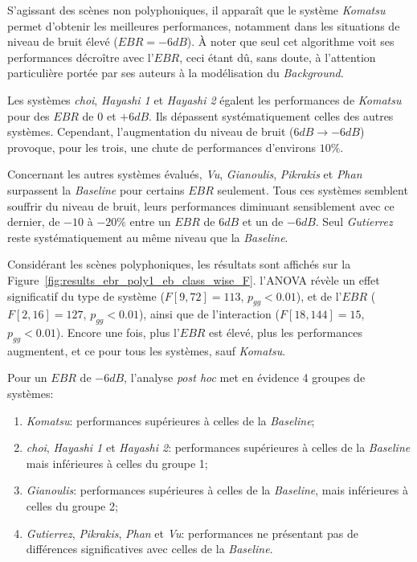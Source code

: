 S'agissant des scènes non polyphoniques, il apparaît que le système \emph{Komatsu} permet d'obtenir les meilleures performances, notamment dans les situations de niveau de bruit élevé ($EBR=-6dB$). À noter que seul cet algorithme voit ses performances décroître avec l'$EBR$, ceci étant dû, sans doute, à l'attention particulière portée par ses auteurs à la modélisation du \emph{Background}.


Les systèmes \emph{choi}, \emph{Hayashi 1} et \emph{Hayashi 2} égalent les performances de \emph{Komatsu} pour des $EBR$ de $0$ et $+6dB$. Ils dépassent systématiquement celles des autres systèmes. Cependant, l'augmentation du niveau de bruit ($6dB\rightarrow -6dB$) provoque, pour les trois, une chute de performances d'environs $10\%$.

Concernant les autres systèmes évalués, \emph{Vu}, \emph{Gianoulis}, \emph{Pikrakis} et \emph{Phan} surpassent la \emph{Baseline} pour certains $EBR$ seulement. Tous ces systèmes semblent souffrir du niveau de bruit, leurs performances diminuant sensiblement avec ce dernier, de $-10$ à $-20\%$ entre un $EBR$ de $6dB$ et un de $-6dB$. Seul \emph{Gutierrez} reste systématiquement au même niveau que la \emph{Baseline}.

Considérant les scènes polyphoniques, les résultats sont affichés sur la Figure~\ref{fig:results_ebr_poly1_eb_class_wise_F}. l'ANOVA révèle un effet significatif du type de système ($F[9,72]=113$, $p_{gg}<0.01$), et de l'$EBR$ ($F[2,16]=127$, $p_{gg}<0.01$), ainsi que de l'interaction ($F[18,144]=15$, $p_{gg}<0.01$). Encore une fois, plus l'$EBR$ est élevé, plus les performances augmentent, et ce pour tous les systèmes, sauf \emph{Komatsu}.

Pour un $EBR$ de $-6dB$, l'analyse \emph{post hoc} met en évidence 4 groupes de systèmes:

\begin{enumerate}
\item \emph{Komatsu}: performances supérieures à celles de la \emph{Baseline};
\item \emph{choi}, \emph{Hayashi 1} et \emph{Hayashi 2}: performances supérieures à celles de la \emph{Baseline} mais inférieures à celles du groupe 1;
\item \emph{Gianoulis}: performances supérieures à celles de la \emph{Baseline}, mais inférieures à celles du groupe 2;
\item \emph{Gutierrez}, \emph{Pikrakis}, \emph{Phan} et \emph{Vu}: performances ne présentant pas de différences significatives avec celles de la \emph{Baseline}.
\end{enumerate}

